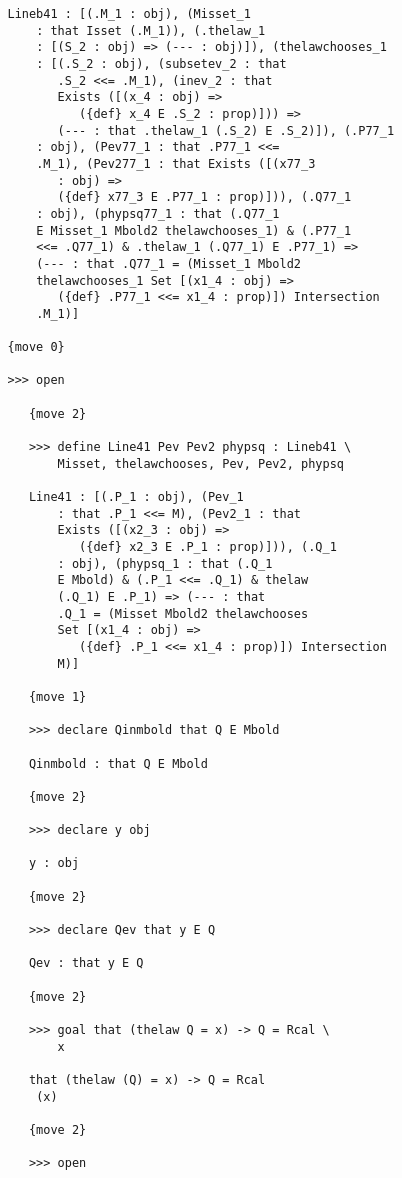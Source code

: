 \documentclass[12pt]{article}
\begin{document}
\begin{verbatim}
   Lineb41 : [(.M_1 : obj), (Misset_1 
       : that Isset (.M_1)), (.thelaw_1 
       : [(S_2 : obj) => (--- : obj)]), (thelawchooses_1 
       : [(.S_2 : obj), (subsetev_2 : that 
          .S_2 <<= .M_1), (inev_2 : that 
          Exists ([(x_4 : obj) => 
             ({def} x_4 E .S_2 : prop)])) => 
          (--- : that .thelaw_1 (.S_2) E .S_2)]), (.P77_1 
       : obj), (Pev77_1 : that .P77_1 <<= 
       .M_1), (Pev277_1 : that Exists ([(x77_3 
          : obj) => 
          ({def} x77_3 E .P77_1 : prop)])), (.Q77_1 
       : obj), (phypsq77_1 : that (.Q77_1 
       E Misset_1 Mbold2 thelawchooses_1) & (.P77_1 
       <<= .Q77_1) & .thelaw_1 (.Q77_1) E .P77_1) => 
       (--- : that .Q77_1 = (Misset_1 Mbold2 
       thelawchooses_1 Set [(x1_4 : obj) => 
          ({def} .P77_1 <<= x1_4 : prop)]) Intersection 
       .M_1)]

   {move 0}

   >>> open

      {move 2}

      >>> define Line41 Pev Pev2 phypsq : Lineb41 \
          Misset, thelawchooses, Pev, Pev2, phypsq

      Line41 : [(.P_1 : obj), (Pev_1 
          : that .P_1 <<= M), (Pev2_1 : that 
          Exists ([(x2_3 : obj) => 
             ({def} x2_3 E .P_1 : prop)])), (.Q_1 
          : obj), (phypsq_1 : that (.Q_1 
          E Mbold) & (.P_1 <<= .Q_1) & thelaw 
          (.Q_1) E .P_1) => (--- : that 
          .Q_1 = (Misset Mbold2 thelawchooses 
          Set [(x1_4 : obj) => 
             ({def} .P_1 <<= x1_4 : prop)]) Intersection 
          M)]

      {move 1}

      >>> declare Qinmbold that Q E Mbold

      Qinmbold : that Q E Mbold

      {move 2}

      >>> declare y obj

      y : obj

      {move 2}

      >>> declare Qev that y E Q

      Qev : that y E Q

      {move 2}

      >>> goal that (thelaw Q = x) -> Q = Rcal \
          x

      that (thelaw (Q) = x) -> Q = Rcal 
       (x)

      {move 2}

      >>> open


\end{verbatim}
\end{document}
